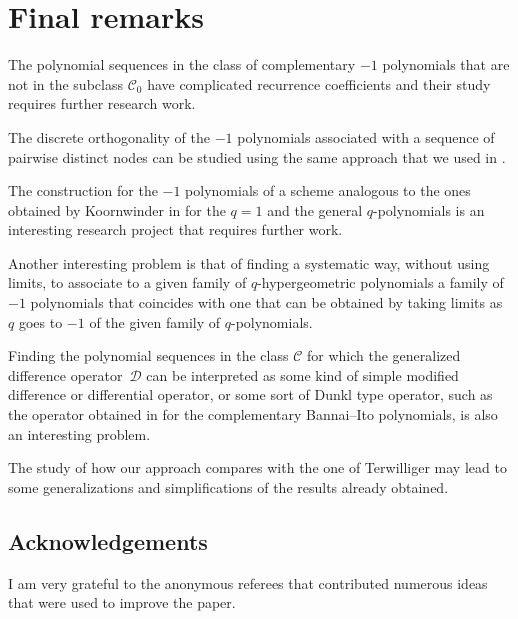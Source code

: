 \documentclass[10pt,a4paper]{amsart}
\def\cC{\mathcal C}
\def\cD{\mathcal D}
\numberwithin{equation}{section}
\begin{document}
\section{Final remarks}\label{section8}
The polynomial sequences in the class of complementary $-1$ polynomials that are not in the subclass $\cC_0$ have complicated recurrence coefficients and their study requires further research work.

The discrete orthogonality of the $-1$ polynomials associated with a sequence of pairwise distinct nodes can be studied using the same approach that we used in \cite{qdiscr}.

The construction for the $-1$ polynomials of a scheme analogous to the ones obtained by Koornwinder in \cite{KAsk,K2,K3} for the $q=1$ and the general $q$-polynomials is an interesting research project that requires further work.

Another interesting problem is that of finding a systematic way, without using limits, to associate to a given family of $q$-hypergeometric polynomials a family of $-1$ polynomials that coincides with one that can be obtained by taking limits as $q$ goes to $-1$ of the given family of $q$-polynomials.

 Finding the polynomial sequences in the class $\cC$ for which the generalized difference operator~$\cD$ can be interpreted as some kind of simple modified difference or differential operator, or some sort of Dunkl type operator, such as the operator obtained in \cite{GenVZ2} for the complementary Bannai--Ito polynomials, is also an interesting problem.

The study of how our approach compares with the one of Terwilliger may lead to some generalizations and simplifications of the results already obtained.


\subsection*{Acknowledgements}
I am very grateful to the anonymous referees that contributed numerous ideas that were used to improve the paper.

\end{document}

